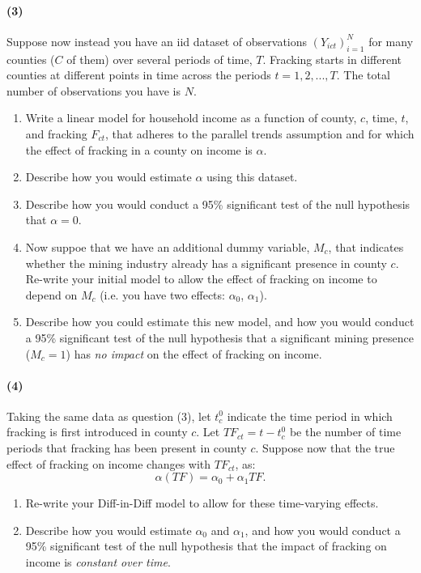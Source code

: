 \documentclass[12pt]{article}
\numberwithin{equation}{section}
\numberwithin{figure}{section}
\numberwithin{table}{section}
\begin{document}
\paragraph{(3)} Suppose now instead you have an iid dataset of observations $(Y_{ict})_{i=1}^N$ for many counties ($C$ of them) over several periods of time, $T$. Fracking starts in different counties at different points in time across the periods $t=1,2,...,T$. The total number of observations you have is $N$.
\begin{enumerate}
\item Write a linear model for household income as a function of county, $c$, time, $t$, and fracking $F_{ct}$, that adheres to the parallel trends assumption and for which the effect of fracking in a county on income is $\alpha$.
\item Describe how you would estimate $\alpha$ using this dataset.
\item Describe how you would conduct a 95\% significant test of the null hypothesis that $\alpha= 0$.
\item Now suppoe that we have an additional dummy variable, $M_c$, that indicates whether the mining industry already has a significant presence in county $c$. Re-write your initial model to allow the effect of fracking on income to depend on $M_c$ (i.e. you have two effects: $\alpha_0$, $\alpha_1$).
\item Describe how you could estimate this new model, and how you would conduct a 95\% significant test of the null hypothesis that a significant mining presence ($M_c=1$) has \emph{no impact} on the effect of fracking on income.
\end{enumerate}

\paragraph{(4)} Taking the same data as question (3), let $t^0_c$ indicate the time period in which fracking is first introduced in county $c$. Let $TF_{ct} = t - t^0_c$ be the number of time periods that fracking has been present in county $c$. Suppose now that the true effect of fracking on income changes with $TF_{ct}$, as:
\[\alpha(TF) = \alpha_0 + \alpha_1 TF.\]
\begin{enumerate}
\item Re-write your Diff-in-Diff model to allow for these time-varying effects.
\item Describe how you would estimate $\alpha_0$ and $\alpha_1$, and how you would conduct a 95\% significant test of the null hypothesis that the impact of fracking on income is \emph{constant over time}.
\end{enumerate}
\end{document}
